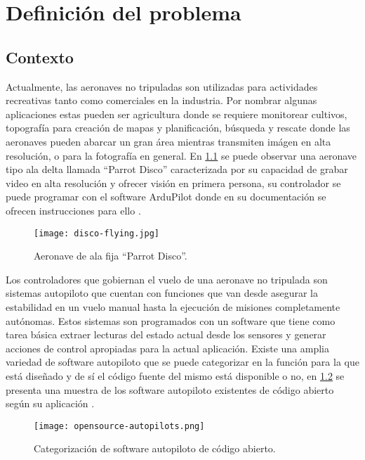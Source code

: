 \chapter{Definición del problema}

\section{Contexto}

Actualmente, las aeronaves no tripuladas son utilizadas para actividades recreativas tanto como comerciales en la industria. Por nombrar algunas aplicaciones estas pueden ser agricultura donde se requiere monitorear cultivos, topografía para creación de mapas y planificación, búsqueda y rescate donde las aeronaves pueden abarcar un gran área mientras transmiten imágen en alta resolución, o para la fotografía en general. En \cref{fig:disco} se puede observar una aeronave tipo ala delta llamada ``Parrot Disco'' caracterizada por su capacidad de grabar video en alta resolución y ofrecer visión en primera persona, su controlador se puede programar con el software ArduPilot donde en su documentación se ofrecen instrucciones para ello \cite{disco2}.

\begin{figure}[h]
    \centering
    \texttt{[image: disco-flying.jpg]}
    \caption[Aeronave de ala fija ``Parrot Disco''.]{Aeronave de ala fija ``Parrot Disco''.\footnotemark}
    \label{fig:disco}
\end{figure}

Los controladores que gobiernan el vuelo de una aeronave no tripulada son sistemas autopiloto que cuentan con funciones que van desde asegurar la estabilidad en un vuelo manual hasta la ejecución de misiones completamente autónomas. Estos sistemas son programados con un software que tiene como tarea básica extraer lecturas del estado actual desde los sensores y generar acciones de control apropiadas para la actual aplicación. Existe una amplia variedad de software autopiloto que se puede categorizar en la función para la que está diseñado y de sí el código fuente del mismo está disponible o no, en \cref{fig:opensource-autopilots} se presenta una muestra de los software autopiloto existentes de código abierto según su aplicación \cite{survey}.

\begin{figure}[h]
    \centering
    \texttt{[image: opensource-autopilots.png]}
    \caption[Categorización de software autopiloto de código abierto.]{Categorización de software autopiloto de código abierto.\footnotemark}
    \label{fig:opensource-autopilots}
\end{figure}

